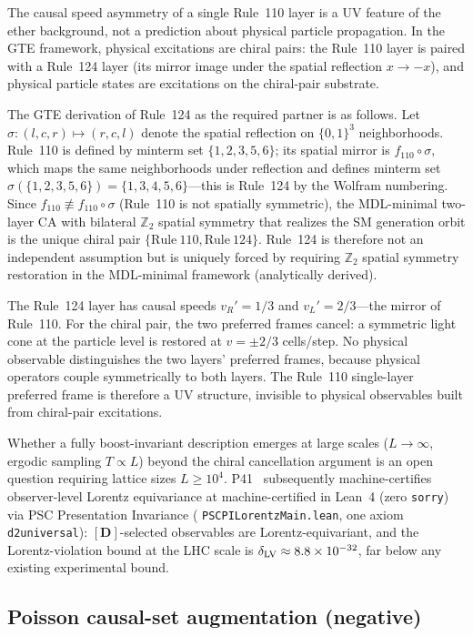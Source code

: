 \documentclass[11pt]{article}
\theoremstyle{remark}
\newcommand{\lean}[1]{%
  \penalty-100
  \begingroup\def\_{\textunderscore\allowbreak}\texttt{#1}\endgroup}
\newcommand{\CatAL}{machine-certified in Lean~4 (zero \texttt{sorry})}
\newcommand{\CatAD}{analytically derived}
\begin{document}
The causal speed asymmetry of a single Rule~110 layer is a UV feature
of the ether background, not a prediction about physical particle propagation.
In the GTE framework, physical excitations are chiral pairs: the Rule~110
layer is paired with a Rule~124 layer (its mirror image under the spatial
reflection $x \to -x$), and physical particle states are excitations on the
chiral-pair substrate.

The GTE derivation of Rule~124 as the required partner is as follows.
Let $\sigma: (l,c,r) \mapsto (r,c,l)$ denote the spatial reflection on
$\{0,1\}^3$ neighborhoods.
Rule~110 is defined by minterm set $\{1,2,3,5,6\}$; its spatial mirror is
$f_{110} \circ \sigma$, which maps the same neighborhoods under reflection and
defines minterm set $\sigma(\{1,2,3,5,6\}) = \{1,3,4,5,6\}$---this is
Rule~124 by the Wolfram numbering.
Since $f_{110} \not\equiv f_{110} \circ \sigma$ (Rule~110 is not spatially
symmetric), the MDL-minimal two-layer CA with bilateral $\mathbb{Z}_2$
spatial symmetry that realizes the SM generation orbit is the unique chiral
pair $\{\mathrm{Rule}~110, \mathrm{Rule}~124\}$.
Rule~124 is therefore not an independent assumption but is uniquely forced by
requiring $\mathbb{Z}_2$ spatial symmetry restoration in the MDL-minimal
framework (\CatAD).

The Rule~124 layer has causal speeds $v_R' = 1/3$ and $v_L' = 2/3$---the
mirror of Rule~110.
For the chiral pair, the two preferred frames cancel: a symmetric light cone
at the particle level is restored at $v = \pm 2/3$ cells/step.
No physical observable distinguishes the two layers' preferred frames, because
physical operators couple symmetrically to both layers.
The Rule~110 single-layer preferred frame is therefore a UV structure,
invisible to physical observables built from chiral-pair excitations.

Whether a fully boost-invariant description emerges at large scales
($L \to \infty$, ergodic sampling $T \propto L$) beyond the chiral
cancellation argument is an open question requiring lattice
sizes $L \geq 10^4$.
P41~\cite{SpivackCMCA} subsequently machine-certifies observer-level Lorentz
equivariance at \CatAL{} via PSC Presentation Invariance
(\lean{PSCPILorentzMain.lean}, one axiom \lean{d2\_universal}):
$[\mathbf{D}]$-selected observables are Lorentz-equivariant, and the
Lorentz-violation bound at the LHC scale is $\delta_{\rm LV} \approx 8.8 \times 10^{-32}$,
far below any existing experimental bound.

\subsection{Poisson causal-set augmentation (negative)}
\label{ssec:poisson_negative}
\end{document}

